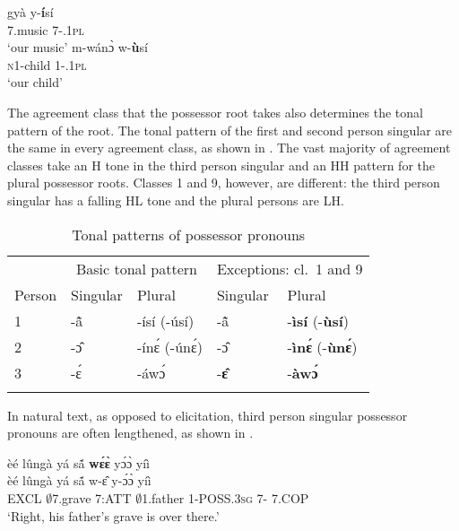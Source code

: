 \ea \label{w}
  \ea  \label{w1}
  \gll     gyà y-{\bfseries í}sí \\
                7.music 7-{\POSS}.1\textsc{pl} \\
    \trans `our music'
\ex\label{w2}
 \gll     m-wánɔ̀ w-{\bfseries ù}sí \\
                \textsc{n}1-child 1-{\POSS}.1\textsc{pl} \\
    \trans `our child'
\z
\z

The agreement class that the possessor root takes also determines the tonal pattern of the root. The tonal pattern of the first and second person singular are the same in every agreement class, as shown in . The vast majority of agreement classes take an H tone in the third person singular and an HH pattern for the plural possessor roots. Classes 1 and 9, however, are different: the third person singular has a falling HL tone and the plural persons are LH.

\begin{table}
\begin{tabular}{l ll ll}
 \lsptoprule
 & \multicolumn{2}{c}{Basic tonal pattern} & \multicolumn{2}{c}{Exceptions: cl.~1 and 9} \\
 \cmidrule(lr){2-3}\cmidrule(lr){4-5}
 Person & Singular & Plural & Singular & Plural \\
  \midrule
 1 & -ã̂ & -ísí (-úsí) & -ã̂ & -{\bfseries ìsí} (-{\bfseries ùsí}) \\
 2 & -ɔ̂ & -ínɛ́ (-únɛ́) & -ɔ̂ & -{\bfseries ìnɛ́} (-{\bfseries ùnɛ́}) \\
 3 & -ɛ́ & -áwɔ́ & -{\bfseries ɛ̂} & -{\bfseries àwɔ́} \\
  \lspbottomrule
\end{tabular}
\caption{Tonal patterns of possessor pronouns}
\label{Tab:TonePoss}
\end{table}

In natural text, as opposed to elicitation, third person singular possessor pronouns are often lengthened, as shown in .

\begin{exe} 
\ex\label{POSSlength} 
  \glll  èé lûngà yá sã́ {\bfseries wɛ́ɛ̀} yɔ́ɔ̀ yíì \\
          èé lûngà yá sã́ w-ɛ̂ y-ɔ́ɔ̀ yíì \\
           EXCL $\emptyset$7.grave 7:ATT $\emptyset$1.father 1-POSS.3\textsc{sg} 7-{\OBJ} 7.COP\\
    \trans `Right, his father's grave is over there.'
\end{exe}

